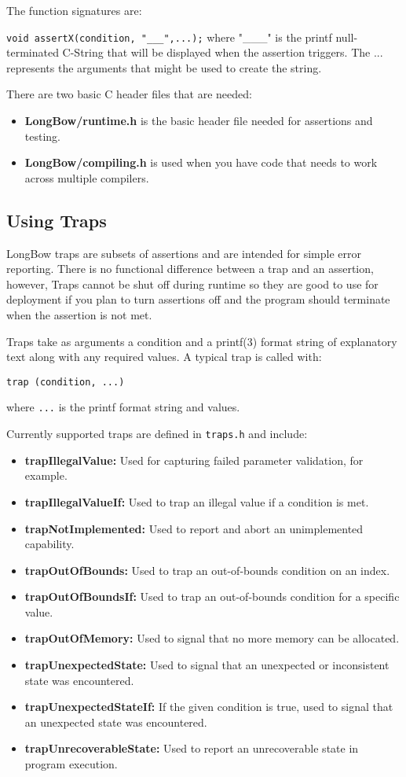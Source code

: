 \documentclass[12pt]{article} %
\begin{document}
The function signatures are:

\hfill \texttt{void assertX(condition, "\_\_\_",...);} \hfill \break
where "\_\_\_" is the printf null-terminated C-String that will be displayed when the assertion triggers.  The ... represents the arguments that might be used to create the string.

There are two basic C header files that are needed:
\begin{itemize}
\item \textbf{LongBow/runtime.h} is the basic header file needed for assertions and testing.
\item \textbf{LongBow/compiling.h} is used when you have code that needs to work across multiple compilers.
\end{itemize} 

\subsection {Using Traps}
LongBow traps are subsets of assertions and are intended for simple error reporting. There is no functional difference between a trap and an assertion, however, Traps cannot be shut off during runtime so they are good to use for deployment if you plan to turn assertions off and the program should terminate when the assertion is not met.

Traps take as arguments a condition and a printf(3) format string of explanatory text along with any required values. A typical trap is called with:

{\tt trap (condition, ...) }

where {\tt ...} is the printf format string and values.

\noindent Currently supported traps are defined in \texttt{traps.h} and include:
\begin{itemize}
\item  \textbf{trapIllegalValue:} Used for capturing failed parameter validation, for example.
\item  \textbf{trapIllegalValueIf:} Used to trap an illegal value if a condition is met.
\item  \textbf{trapNotImplemented:} Used to report and abort an unimplemented capability.
\item  \textbf{trapOutOfBounds:}  Used to trap an out-of-bounds condition on an index.
\item  \textbf{trapOutOfBoundsIf:} Used to trap an out-of-bounds condition for a specific value.
\item  \textbf{trapOutOfMemory:} Used to signal that no more memory can be allocated.
\item  \textbf{trapUnexpectedState:} Used to signal that an unexpected or inconsistent state was encountered.
\item  \textbf{trapUnexpectedStateIf:} If the given condition is true, used to signal that an unexpected state was encountered.
\item  \textbf{trapUnrecoverableState:} Used to report an unrecoverable state in program execution.
\end{itemize}
\end{document}
